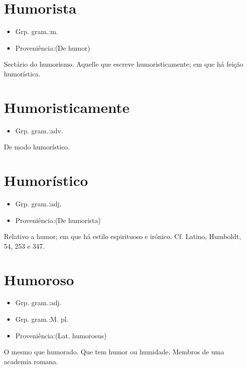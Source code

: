 \documentclass{article}
\begin{document}
\section{Humorista}
\begin{itemize}
\item {Grp. gram.:m.}
\end{itemize}
\begin{itemize}
\item {Proveniência:(De \textunderscore humor\textunderscore )}
\end{itemize}
Sectário do humorismo.
Aquelle que escreve humoristicamente; em que há feição humorística.
\section{Humoristicamente}
\begin{itemize}
\item {Grp. gram.:adv.}
\end{itemize}
De modo humorístico.
\section{Humorístico}
\begin{itemize}
\item {Grp. gram.:adj.}
\end{itemize}
\begin{itemize}
\item {Proveniência:(De \textunderscore humorista\textunderscore )}
\end{itemize}
Relativo a humor; em que há estilo espirituoso e irónico. Cf. Latino, \textunderscore Humboldt\textunderscore , 54, 253 e 347.
\section{Humoroso}
\begin{itemize}
\item {Grp. gram.:adj.}
\end{itemize}
\begin{itemize}
\item {Grp. gram.:M. pl.}
\end{itemize}
\begin{itemize}
\item {Proveniência:(Lat. \textunderscore humorosus\textunderscore )}
\end{itemize}
O mesmo que \textunderscore humorado\textunderscore .
Que tem humor ou humidade.
Membros de uma academia romana.
\end{document}
